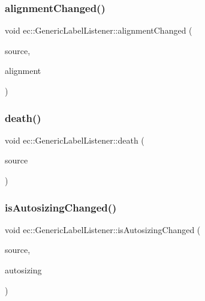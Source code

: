 \subsubsection{\texorpdfstring{alignment\+Changed()}{alignmentChanged()}}
{\footnotesize\ttfamily void ec\+::\+Generic\+Label\+Listener\+::alignment\+Changed (\begin{DoxyParamCaption}\item[{agui\+::\+Label $\ast$}]{source,  }\item[{agui\+::\+Area\+Alignment\+Enum}]{alignment }\end{DoxyParamCaption})\hspace{0.3cm}{\ttfamily [override]}}

\mbox{\label{classec_1_1_generic_label_listener_a941183da9f6cef4a2ab6ced1814a2d84}} 
\subsubsection{\texorpdfstring{death()}{death()}}
{\footnotesize\ttfamily void ec\+::\+Generic\+Label\+Listener\+::death (\begin{DoxyParamCaption}\item[{agui\+::\+Label $\ast$}]{source }\end{DoxyParamCaption})\hspace{0.3cm}{\ttfamily [override]}}

\mbox{\label{classec_1_1_generic_label_listener_aec79c600f300b002190155d67794e3c6}} 
\subsubsection{\texorpdfstring{is\+Autosizing\+Changed()}{isAutosizingChanged()}}
{\footnotesize\ttfamily void ec\+::\+Generic\+Label\+Listener\+::is\+Autosizing\+Changed (\begin{DoxyParamCaption}\item[{agui\+::\+Label $\ast$}]{source,  }\item[{bool}]{autosizing }\end{DoxyParamCaption})\hspace{0.3cm}{\ttfamily [override]}}

